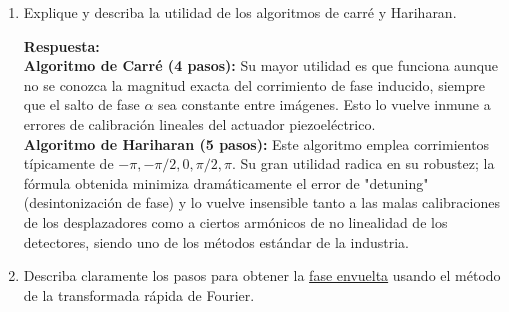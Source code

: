 \documentclass[12pt]{article}
\begin{document}
\begin{enumerate}
		Realizamos substracciones entre imágenes para aislar términos:
		\[ I_1 - I_2 = \frac{\sqrt{2}}{2} I_m [\cos\phi - \sin\phi - (-\cos\phi - \sin\phi)] = \sqrt{2} I_m \cos\phi \]
		\[ I_3 - I_2 = \frac{\sqrt{2}}{2} I_m [-\cos\phi + \sin\phi - (-\cos\phi - \sin\phi)] = \sqrt{2} I_m \sin\phi \]
		
		Dividiendo estas dos diferencias:
		\[ \frac{I_3 - I_2}{I_1 - I_2} = \frac{\sqrt{2} I_m \sin\phi}{\sqrt{2} I_m \cos\phi} = \tan\phi \]
		
		Finalmente, despejando la fase $\phi$ (o $\Delta\theta$):
		\[ \Delta\theta = \arctan \left( \frac{I_3 - I_2}{I_1 - I_2} \right) \]
		
		\vspace{0.5cm}
		\item Explique y describa la utilidad de los algoritmos de carré y Hariharan.
		
		\vspace{0.2cm}
		\textcolor{blue!70!black}{\textbf{Respuesta:}} \\
		\textbf{Algoritmo de Carré (4 pasos):} Su mayor utilidad es que funciona aunque no se conozca la magnitud exacta del corrimiento de fase inducido, siempre que el salto de fase $\alpha$ sea constante entre imágenes. Esto lo vuelve inmune a errores de calibración lineales del actuador piezoeléctrico. \\
		\textbf{Algoritmo de Hariharan (5 pasos):} Este algoritmo emplea corrimientos típicamente de $-\pi, -\pi/2, 0, \pi/2, \pi$. Su gran utilidad radica en su robustez; la fórmula obtenida minimiza dramáticamente el error de "detuning" (desintonización de fase) y lo vuelve insensible tanto a las malas calibraciones de los desplazadores como a ciertos armónicos de no linealidad de los detectores, siendo uno de los métodos estándar de la industria.
		
		\vspace{0.5cm}
		\item Describa claramente los pasos para obtener la \underline{fase envuelta} usando el método de la transformada rápida de Fourier.
		

\end{enumerate}
\end{document}
